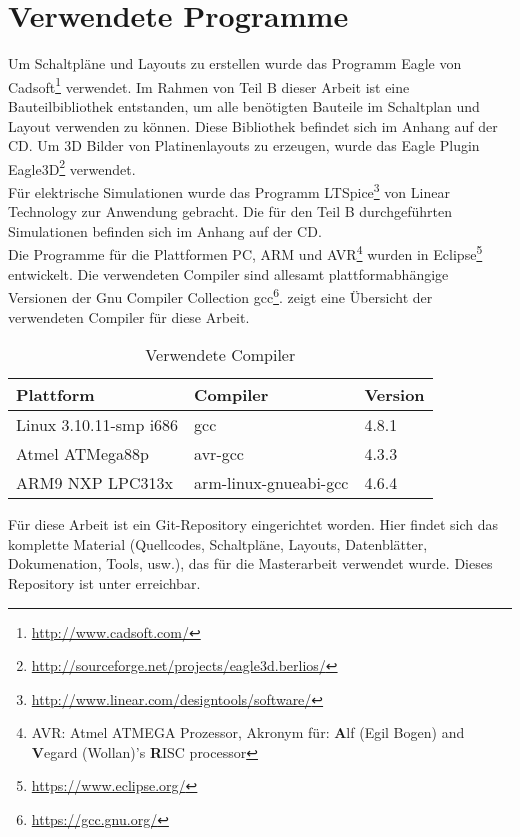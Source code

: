 \section{Verwendete Programme}
Um Schaltpläne und Layouts zu erstellen wurde das Programm Eagle von Cadsoft\footnote{\url{http://www.cadsoft.com/}} verwendet. Im Rahmen von Teil B dieser Arbeit ist eine Bauteilbibliothek entstanden, um alle benötigten Bauteile im Schaltplan und Layout verwenden zu können. Diese Bibliothek befindet sich im Anhang auf der CD.
Um 3D Bilder von Platinenlayouts zu erzeugen, wurde das Eagle Plugin Eagle3D\footnote{\url{http://sourceforge.net/projects/eagle3d.berlios/}} verwendet.\\
Für elektrische Simulationen wurde das Programm LTSpice\footnote{\url{http://www.linear.com/designtools/software/}} von Linear Technology zur Anwendung gebracht. Die für den Teil B durchgeführten Simulationen befinden sich im Anhang auf der CD.\\
Die Programme für die Plattformen PC, ARM und AVR\footnote{AVR: Atmel ATMEGA Prozessor, Akronym für: \textbf{A}lf (Egil Bogen) and \textbf{V}egard (Wollan)'s \textbf{R}ISC processor} wurden in Eclipse\footnote{\url{https://www.eclipse.org/}} entwickelt. Die verwendeten Compiler sind allesamt plattformabhängige Versionen der Gnu Compiler Collection gcc\footnote{\url{https://gcc.gnu.org/}}.  zeigt eine Übersicht der verwendeten Compiler für diese Arbeit.

\begin{table}[h]
\begin{tabular}{|p{4.5cm}|p{4cm}|p{4cm}|}\hline
\rowcolor{TableBackgroundColor} 
\textbf{Plattform}		&	\textbf{Compiler}		&	\textbf{Version}  \\ \hline
 Linux 3.10.11-smp i686	&	gcc						& 4.8.1	\\ \hline
 Atmel ATMega88p		&	avr-gcc					& 4.3.3	\\ \hline
 ARM9 NXP LPC313x		&	arm-linux-gnueabi-gcc	& 4.6.4	\\ \hline
\end{tabular}
\caption{Verwendete Compiler}
\label{tab:verwendete_compiler}
\end{table}

Für diese Arbeit ist ein Git-Repository eingerichtet worden. Hier findet sich das komplette Material (Quellcodes, Schaltpläne, Layouts, Datenblätter, Dokumenation, Tools, usw.), das für die Masterarbeit verwendet wurde. Dieses Repository ist unter  erreichbar.